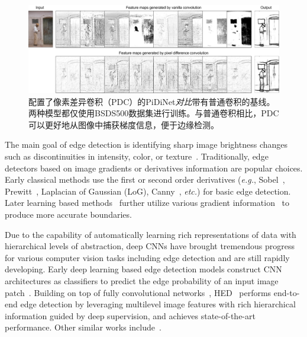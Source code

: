 \documentclass[10pt,twocolumn,letterpaper]{article}
\begin{document}
\begin{figure}[t!]
    \centering
    \includegraphics[width=0.98\linewidth]{images/figure_intro2.pdf}
    \caption{配置了像素差异卷积（PDC）的PiDiNet\emph{对比}带有普通卷积的基线。两种模型都仅使用BSDS500数据集进行训练。与普通卷积相比，PDC可以更好地从图像中捕获梯度信息，便于边缘检测。}
    \label{fig:figure2}
\end{figure}


The main goal of edge detection is identifying sharp image brightness changes such as discontinuities in intensity, color, or texture~\cite{torre1986edge}. Traditionally, edge detectors based on image gradients or derivatives information are popular choices. Early classical methods use the first or second order derivatives (\emph{e.g.}, Sobel~\cite{sobel19683x3}, Prewitt~\cite{prewitt1970object}, Laplacian of Gaussian (LoG), Canny~\cite{canny1986computational}, \emph{etc.}) for basic edge detection. Later learning based methods~\cite{hallman2015oef,dollar2014se} further utilize various gradient information~\cite{xiaofeng2012scg, martin2004pb,fowlkes2002learningpb,gupta2014seng} to produce more accurate boundaries.

Due to the capability of automatically learning rich representations of data with hierarchical levels of abstraction, deep CNNs have brought tremendous progress for various computer vision tasks including edge detection and are still rapidly developing. Early deep learning based edge detection models construct CNN architectures as classifiers to predict the edge probability of an input image patch~\cite{bertasius2015deepedge,shen2015deepcontour,bertasius2015hfl}. Building on top of fully convolutional networks~\cite{long2015fully}, HED~\cite{xie2017holistically} performs end-to-end edge detection by leveraging multilevel image features with rich hierarchical information guided by deep supervision, and achieves state-of-the-art performance. Other similar works include~\cite{yang2016cedn,kokkinos2015deepboundary,maninis2016cob,wang2017ced,xu2018amhnet,liu2019richer,deng2018lpcb,he2019bidirectional}.
\end{document}
